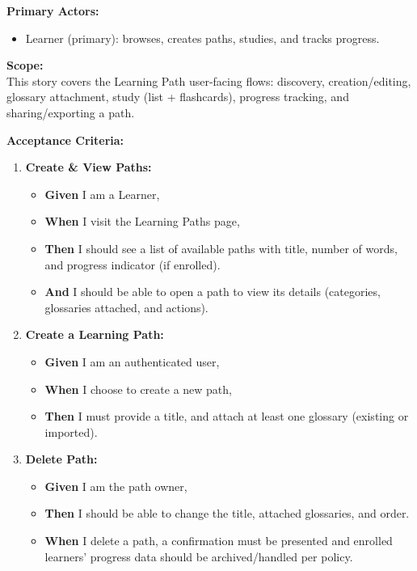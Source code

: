 \documentclass[12pt]{article}
\begin{document}
\vspace{1em}
\textbf{Primary Actors:}
\begin{itemize}
    \item Learner (primary): browses, creates paths, studies, and tracks progress.
\end{itemize}

\vspace{1em}
\textbf{Scope:} \\
This story covers the Learning Path user-facing flows: discovery, creation/editing, glossary attachment, study (list + flashcards), progress tracking, and sharing/exporting a path.

\vspace{1em}
\textbf{Acceptance Criteria:}
\begin{enumerate}
    \item \textbf{Create \& View Paths:}
    \begin{itemize}
        \item \textbf{Given} I am a Learner,
        \item \textbf{When} I visit the Learning Paths page,
        \item \textbf{Then} I should see a list of available paths with title, number of words, and progress indicator (if enrolled).
        \item \textbf{And} I should be able to open a path to view its details (categories, glossaries attached, and actions).
    \end{itemize}

    \item \textbf{Create a Learning Path:}
    \begin{itemize}
        \item \textbf{Given} I am an authenticated user,
        \item \textbf{When} I choose to create a new path,
        \item \textbf{Then} I must provide a title, and attach at least one glossary (existing or imported).
    \end{itemize}

    \item \textbf{Delete Path:}
    \begin{itemize}
        \item \textbf{Given} I am the path owner,
        \item \textbf{Then} I should be able to change the title, attached glossaries, and order.
        \item \textbf{When} I delete a path, a confirmation must be presented and enrolled learners' progress data should be archived/handled per policy.
    \end{itemize}


\end{enumerate}
\end{document}
